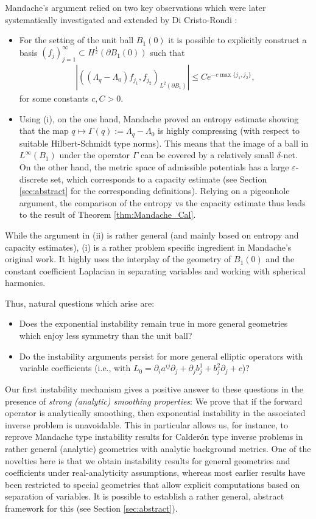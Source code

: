 \documentclass[12pt,twoside]{amsart}
\numberwithin{equation}{section}
\renewcommand{\leq}{\leqslant}
\newcommand {\p} {\partial}
\newcommand{\eps}{\varepsilon}
\begin{document}
Mandache's argument relied on two key observations which were later systematically investigated and extended by Di Cristo-Rondi \cite{DiCristoRondi}:
\begin{itemize}
\item[(i)] For the setting of the unit ball $B_{1}(0)$ it is possible to explicitly construct a basis $(f_j)_{j=1}^{\infty} \subset H^{\frac{1}{2}}(\partial B_1(0))$ such that
\begin{align*}
|((\Lambda_{q}-\Lambda_0)f_{j_1}, f_{j_2})_{L^2(\partial B_1)}| \leq C e^{-c\max\{j_1, j_2\}} ,
\end{align*}
for some constants $c,C>0$.
\item[(ii)] Using (i), on the one hand, Mandache proved an entropy estimate showing that the map $q \mapsto \Gamma(q) := \Lambda_{q}-\Lambda_0$ is highly compressing (with respect to suitable Hilbert-Schmidt type norms). This means that the image of a ball in $L^{\infty}(B_1)$ under the operator $\Gamma$ can be covered by a relatively small $\delta$-net. On the other hand, the metric space of admissible potentials has a large $\eps$-discrete set, which corresponds to a capacity estimate (see Section \ref{sec:abstract} for the corresponding definitions). Relying on a pigeonhole argument, the comparison of the entropy vs the capacity estimate thus leads to the result of Theorem \ref{thm:Mandache_Cal}.
\end{itemize}
While the argument in (ii) is rather general (and mainly based on entropy and capacity estimates), (i) is a rather problem specific ingredient in Mandache's original work. It highly uses the interplay of the geometry of $B_1(0)$ and the constant coefficient Laplacian in separating variables and working with spherical harmonics. 

Thus, natural questions which arise are:
\begin{itemize}
\item[(Q1)]
Does the exponential instability remain true in more general geometries which enjoy less symmetry than the unit ball? 
\item[(Q2)] Do the instability arguments persist for more general elliptic operators with variable coefficients (i.e., with $L_0 = \p_i a^{ij} \p_j + \p_j b_j^1 + b_j^2 \p_j + c $)?
\end{itemize}

Our first instability mechanism gives a positive answer to these questions in the presence of \emph{strong (analytic) smoothing properties}: We prove that if the forward operator is analytically smoothing, then exponential instability in the associated inverse problem is unavoidable. This in particular allows us, for instance, to reprove Mandache type instability results for Calder\'on type inverse problems in rather general (analytic) geometries with analytic background metrics. One of the novelties here is that we obtain instability results for general geometries and coefficients under real-analyticity assumptions, whereas most earlier results have been restricted to special geometries that allow explicit computations based on separation of variables. It is possible to establish a rather general, abstract framework for this (see Section \ref{sec:abstract}).
\end{document}
